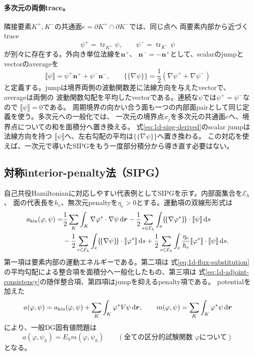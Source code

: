 \documentclass[11pt,a4paper]{article}
\newcommand{\dd}{\mathrm d}
\begin{document}
\paragraph{多次元の両側trace。}
隣接要素$K^+,K^-$の共通面$e=\partial K^+\cap\partial K^-$では、同じ点へ
両要素内部から近づくtrace
\begin{equation}
 \psi^+=\operatorname{tr}_{K^+}\psi,
 \qquad \psi^-=\operatorname{tr}_{K^-}\psi
\end{equation}
が別々に存在する。外向き単位法線を$\boldsymbol n^+$、
$\boldsymbol n^-=-\boldsymbol n^+$として、scalarのjumpとvectorのaverageを
\begin{equation}
 \llbracket \psi\rrbracket=\psi^+\boldsymbol n^++\psi^-\boldsymbol n^- ,
 \qquad
 \{\!\{\nabla \psi\}\!\}=\frac12(\nabla \psi^++\nabla \psi^-)
 \label{eq:jump-average}
\end{equation}
と定義する。jumpは境界両側の波動関数差に法線方向を与えたvectorで、averageは両側の
波動関数勾配を平均したvectorである。連続な$\psi$では$\psi^+=\psi^-$なので
$\llbracket \psi\rrbracket=0$である。
周期境界の向かい合う面も一つの内部面pairとして同じ定義を使う。多次元への一般化では、
一次元の境界点$x_j$を多次元の共通面$e$へ、境界点についての和を面積分へ置き換える。
式\eqref{eq:1d-sipg-derived}のscalar jumpは法線方向を持つ
$\llbracket\psi\rrbracket$へ、左右勾配の平均は$\{\!\{\nabla\psi\}\!\}$へ置き換わる。
この対応を使えば、一次元で導いたSIPGをもう一度部分積分から導き直す必要はない。

\subsection{対称interior-penalty法（SIPG）}
自己共役Hamiltonianに対応しやすい代表例としてSIPGを示す。内部面集合を$\mathcal E_h$、
面の代表長を$h_e$、無次元penaltyを$\eta_e>0$とする。運動項の双線形形式は
\begin{align}
 a_{\rm kin}(\varphi,\psi)
 =&\frac12\sum_K\int_K\nabla \varphi^*\cdot\nabla \psi\,\dd\boldsymbol r
 -\frac12\sum_{e\in\mathcal E_h}\int_e
 \{\!\{\nabla \varphi^*\}\!\}\cdot\llbracket \psi\rrbracket\,\dd s \notag\\
 &-\frac12\sum_{e\in\mathcal E_h}\int_e
 \{\!\{\nabla \psi\}\!\}\cdot\llbracket \varphi^*\rrbracket\,\dd s
 +\frac12\sum_{e\in\mathcal E_h}\int_e
 \frac{\eta_e}{h_e}\llbracket \varphi^*\rrbracket\cdot\llbracket \psi\rrbracket\,\dd s .
 \label{eq:sipg}
\end{align}
第一項は要素内部の運動エネルギーである。第二項は
式\eqref{eq:1d-flux-substitution}の平均勾配による整合項を面積分へ一般化したもの、第三項は
式\eqref{eq:1d-adjoint-consistency}の随伴整合項、第四項はjumpを抑えるpenalty項である。
potentialを加えた
\begin{equation}
 a(\varphi,\psi)=a_{\rm kin}(\varphi,\psi)+\sum_K\int_K\varphi^*V\psi\,\dd\boldsymbol r,
 \qquad m(\varphi,\psi)=\sum_K\int_K\varphi^*\psi\,\dd\boldsymbol r
\end{equation}
により、一般DG固有値問題は
\begin{equation}
 a(\varphi,\psi_h)=E_hm(\varphi,\psi_h)
 \qquad(\text{全ての区分的試験関数 }\varphi\text{について})
 \label{eq:dg-weak}
\end{equation}
となる。
\end{document}
